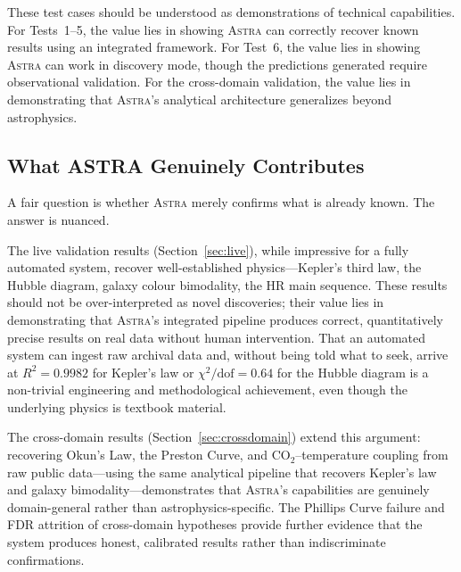\documentclass[fleqn,usenatbib]{mnras}
\newcommand{\astra}{\textsc{Astra}\xspace}
\begin{document}
These test cases should be understood as demonstrations of technical capabilities.
For Tests~1--5, the value lies in showing \astra can correctly recover known results using an integrated framework.
For Test~6, the value lies in showing \astra can work in discovery mode, though the predictions generated require observational validation.
For the cross-domain validation, the value lies in demonstrating that \astra's analytical architecture generalizes beyond astrophysics.

\subsection{What ASTRA Genuinely Contributes}
\label{sec:discussion:contributions}

A fair question is whether \astra merely confirms what is already known.
The answer is nuanced.

The live validation results (Section~\ref{sec:live}), while impressive for a fully automated system, recover well-established physics---Kepler's third law, the Hubble diagram, galaxy colour bimodality, the HR main sequence.
These results should not be over-interpreted as novel discoveries; their value lies in demonstrating that \astra's integrated pipeline produces correct, quantitatively precise results on real data without human intervention.
That an automated system can ingest raw archival data and, without being told what to seek, arrive at $R^{2}=0.9982$ for Kepler's law or $\chi^{2}/\mathrm{dof}=0.64$ for the Hubble diagram is a non-trivial engineering and methodological achievement, even though the underlying physics is textbook material.

The cross-domain results (Section~\ref{sec:crossdomain}) extend this argument: recovering Okun's Law, the Preston Curve, and CO$_{2}$--temperature coupling from raw public data---using the same analytical pipeline that recovers Kepler's law and galaxy bimodality---demonstrates that \astra's capabilities are genuinely domain-general rather than astrophysics-specific.
The Phillips Curve failure and FDR attrition of cross-domain hypotheses provide further evidence that the system produces honest, calibrated results rather than indiscriminate confirmations.
\end{document}
